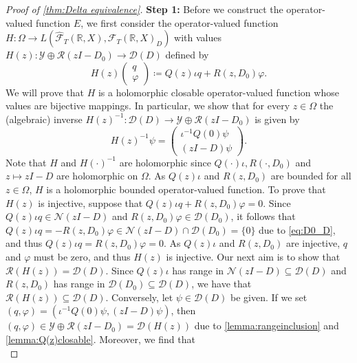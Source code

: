\documentclass[english]{myarticle}
\begin{document}
\begin{sloppypar}
\begin{proof}[Proof of \cref{thm:Delta equivalence}]
\textbf{Step 1:} Before we construct the operator-valued function $E$, we first consider the operator-valued function $H : \Omega \to L(\hat{\mathcal{F}}_T(\mathbb{R},X), \mathcal{F}_T(\mathbb{R},X)_D)$ with values $H(z) : \mathcal{Y} \oplus \mathcal{R}(zI-D_0) \to \mathcal{D}(D)$ defined by
\begin{equation} \label{eq:H(z)rep}
    H(z) \begin{pmatrix}
        q \\
        \varphi
    \end{pmatrix}
    \coloneqq Q(z)\iota q + R(z,D_0) \varphi.
\end{equation}
We will prove that $H$ is a holomorphic closable operator-valued function whose values are bijective mappings. In particular, we show that for every $z \in \Omega$ 
the (algebraic) inverse $H(z)^{-1} : \mathcal{D}(D) \to \mathcal{Y} \oplus \mathcal{R}(zI-D_0)$ is given by
\begin{equation*}
    H(z)^{-1} \psi = 
    \begin{pmatrix}
        \iota^{-1} Q(0)\psi \\
        (zI-D)\psi
    \end{pmatrix}.
\end{equation*}
Note that $H$ and $H(\cdot)^{-1}$ are holomorphic since $Q(\cdot)\iota, R(\cdot,D_0)$ and $z \mapsto zI-D$ are holomorphic on $\Omega$. As $Q(z)\iota$ and $R(z,D_0)$ are bounded for all $z \in \Omega$, $H$ is a holomorphic bounded operator-valued function. To prove that $H(z)$ is injective, suppose that $Q(z)\iota q + R(z,D_0)\varphi = 0$. Since $Q(z)\iota q \in \mathcal{N}(zI - D)$ and $R(z,D_0)\varphi \in \mathcal{D}(D_0)$, it follows that $Q(z) \iota q = - R(z, D_0) \varphi \in \mathcal{N}(zI - D) \cap \mathcal{D}(D_0) = \{0 \}$ due to \eqref{eq:D0_D}, and thus $Q(z) \iota q = R(z, D_0) \varphi = 0$. As $Q(z)\iota$ and $R(z,D_0)$ are injective, $q$ and $\varphi$ must be zero, and thus $H(z)$ is injective. Our next aim is to show that $\mathcal{R}(H(z)) = \mathcal{D}(D)$. Since $Q(z)\iota$ has range in $\mathcal{N}(zI-D) \subseteq \mathcal{D}(D)$ and $R(z,D_0)$ has range in $\mathcal{D}(D_0) \subseteq \mathcal{D}(D)$, we have that $\mathcal{R}(H(z)) \subseteq \mathcal{D}(D)$. Conversely, let $\psi \in \mathcal{D}(D)$ be given. If we set $(q,\varphi) = (\iota^{-1} Q(0)\psi,(zI-D)\psi)$, then $(q,\varphi) \in \mathcal{Y} \oplus \mathcal{R}(zI - D_0) = \mathcal{D}(H(z))$ due to \cref{lemma:rangeinclusion} and \cref{lemma:Q(z)closable}. Moreover, we find that 
\begin{equation*}

\end{equation*}
\end{proof}
\end{sloppypar}
\end{document}
